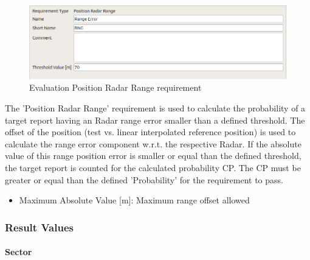 \begin{figure}[H]
    \includegraphics[width=14cm,frame]{figures/eval_req_pos_radar_rng.png}
  \caption{Evaluation Position Radar Range requirement}
\end{figure}

The ’Position Radar Range’ requirement is used to calculate the probability of a target report
having an Radar range error smaller than a defined threshold. The offset of the position
(test vs. linear interpolated reference position) is used to calculate the range error component
w.r.t. the respective Radar. If the absolute value of this range
position error is smaller or equal than the defined threshold, the target report is counted
for the calculated probability CP. The CP must be greater or equal than the
defined ’Probability’ for the requirement to pass.
\ \\

\begin{itemize}  
\item Maximum Absolute Value [m]: Maximum range offset allowed 
\end{itemize}

\subsubsection{Result Values}

\paragraph{Sector}

